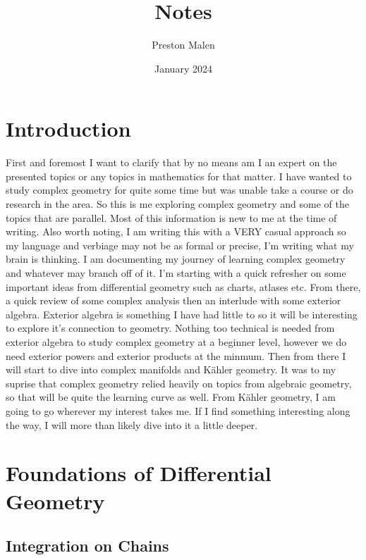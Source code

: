 \documentclass[12pt, letterpaper]{article}
\title{Notes}
\author{Preston Malen}
\date{January 2024}
\begin{document}
\maketitle
\thispagestyle{empty}

\newpage
\thispagestyle{empty}
\section*{Introduction}
First and foremost I want to clarify that by no means am I an expert on the presented
topics or any topics in mathematics for that matter. I have wanted to study complex
geometry for quite some time but was unable take a course or do research in the area.
So this is me exploring complex geometry and some of the topics that are parallel.
Most of this information is new to me at the time of writing. Also worth noting,
I am writing this with a VERY casual approach so my language and verbiage may not be
as formal or precise, I'm writing what my brain is thinking. I am documenting my
journey of learning complex geometry and whatever may branch off of it. I'm starting
with a quick refresher on some important ideas from differential geometry such as
charts, atlases etc. From there, a quick review of some complex analysis then an
interlude with some exterior algebra. Exterior algebra is something I have had
little to so it will be interesting to explore it's connection to geometry.
Nothing too technical is needed from exterior algebra to study complex geometry at a beginner
level, however we do need exterior powers and exterior products at the minmum. Then
from there I will start to dive into complex manifolds and Kähler geometry. It was
to my suprise that complex geometry relied heavily on topics from algebraic geometry,
so that will be quite the learning curve as well. From Kähler geometry, I am going
to go wherever my interest takes me. If I find something interesting along the way,
I will more than likely dive into it a little deeper.

\newpage
\thispagestyle{empty}
\tableofcontents


\newpage
\clearpage




\newpage

\section{Foundations of Differential Geometry}
\subsection{Integration on Chains}
\end{document}
